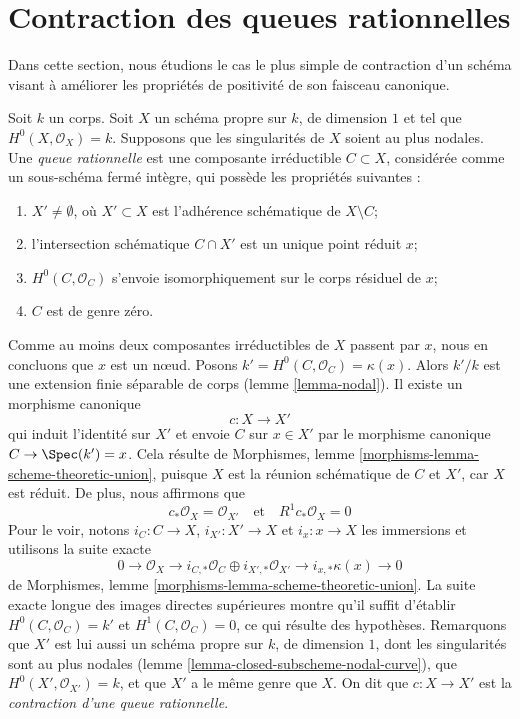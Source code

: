 




\section{Contraction des queues rationnelles}
\label{section-contracting-rational-tails}

\noindent
Dans cette section, nous étudions le cas le plus simple de contraction d'un schéma visant à améliorer les propriétés de positivité de son faisceau canonique.

\begin{example} \label{example-rational-tail} Soit $k$ un corps. Soit $X$ un schéma propre sur $k$, de dimension $1$ et tel que $H^0(X, \mathcal{O}_X) = k$. Supposons que les singularités de $X$ soient au plus nodales. Une {\it queue rationnelle} est une composante irréductible $C \subset X$, considérée comme un sous-schéma fermé intègre, qui possède les propriétés suivantes : \begin{enumerate} \item $X' \not = \emptyset$, où $X' \subset X$ est l'adhérence schématique de $X \setminus C$; \item l'intersection schématique $C \cap X'$ est un unique point réduit $x$; \item $H^0(C, \mathcal{O}_C)$ s'envoie isomorphiquement sur le corps résiduel de $x$; \item $C$ est de genre zéro. \end{enumerate} Comme au moins deux composantes irréductibles de $X$ passent par $x$, nous en concluons que $x$ est un nœud. Posons $k' = H^0(C, \mathcal{O}_C) = \kappa(x)$. Alors $k'/k$ est une extension finie séparable de corps (lemme \ref{lemma-nodal}). Il existe un morphisme canonique $$
c : X \longrightarrow X'
$$ qui induit l'identité sur $X'$ et envoie $C$ sur $x \in X'$ par le morphisme canonique $C \to \Spec(k') = x$. Cela résulte de Morphismes, lemme \ref{morphisms-lemma-scheme-theoretic-union}, puisque $X$ est la réunion schématique de $C$ et $X'$, car $X$ est réduit. De plus, nous affirmons que $$
c_*\mathcal{O}_X = \mathcal{O}_{X'}
\quad\text{et}\quad
R^1c_*\mathcal{O}_X = 0
$$ Pour le voir, notons $i_C : C \to X$, $i_{X'} : X' \to X$ et $i_x : x \to X$ les immersions et utilisons la suite exacte $$
0 \to \mathcal{O}_X \to
i_{C, *}\mathcal{O}_C \oplus i_{X', *}\mathcal{O}_{X'} \to
i_{x, *}\kappa(x) \to 0
$$ de Morphismes, lemme \ref{morphisms-lemma-scheme-theoretic-union}. La suite exacte longue des images directes supérieures montre qu'il suffit d'établir $H^0(C, \mathcal{O}_C) = k'$ et $H^1(C, \mathcal{O}_C) = 0$, ce qui résulte des hypothèses. Remarquons que $X'$ est lui aussi un schéma propre sur $k$, de dimension $1$, dont les singularités sont au plus nodales (lemme \ref{lemma-closed-subscheme-nodal-curve}), que $H^0(X', \mathcal{O}_{X'}) = k$, et que $X'$ a le même genre que $X$. On dit que $c : X \to X'$ est la {\it contraction d'une queue rationnelle}.
\end{example}

